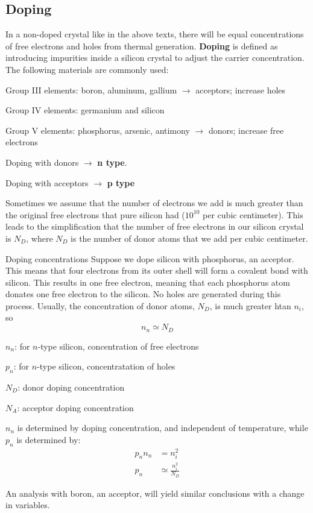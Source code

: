\subsection{Doping}
In a non-doped crystal like in the above texts, there will be equal concentrations of free electrons and holes from thermal generation. \textbf{Doping} is defined as introducing impurities inside a silicon crystal to adjust the carrier concentration. The following materials are commonly used:
\begin{pline}
    \item Group III elements: boron, aluminum, gallium $\rightarrow$ acceptors; increase holes
    \item Group IV elements: germanium and silicon
    \item Group V elements: phosphorus, arsenic, antimony $\rightarrow$ donors; increase free electrons
\end{pline}
Doping with donors $\rightarrow$ \textbf{n type}.

Doping with acceptors $\rightarrow$ \textbf{p type}

Sometimes we assume that the number of electrons we add is much greater than the original free electrons that pure silicon had ($10^{10}$ per cubic centimeter). This leads to the simplification that the number of free electrons in our silicon crystal is $N_D$, where $N_D$ is the number of donor atoms that we add per cubic centimeter.

\begin{Analysis}{Doping concentrations}{}
Suppose we dope silicon with phosphorus, an acceptor. This means that four electrons from its outer shell will form a covalent bond with silicon. This results in one free electron, meaning that each phosphorus atom donates one free electron to the silicon. No holes are generated during this process. Usually, the concentration of donor atoms, $N_D$, is much greater htan $n_i$, so 
    \[n_n \simeq N_D\]
\begin{gline}
    \item $n_n$: for $n$-type silicon, concentration of free electrons
    \item $p_n$: for $n$-type silicon, concentratation of holes
    \item $N_D$: donor doping concentration
    \item $N_A$: acceptor doping concentration
\end{gline}
$n_n$ is determined by doping concentration, and independent of temperature,  while $p_n$ is determined by:
    \begin{align*}
        p_n n_n &= n_i^2 \\
        p_n &\simeq \frac{n_i^2}{N_D}
    \end{align*}

An analysis with boron, an acceptor, will yield similar conclusions with a change in variables.
\end{Analysis}

